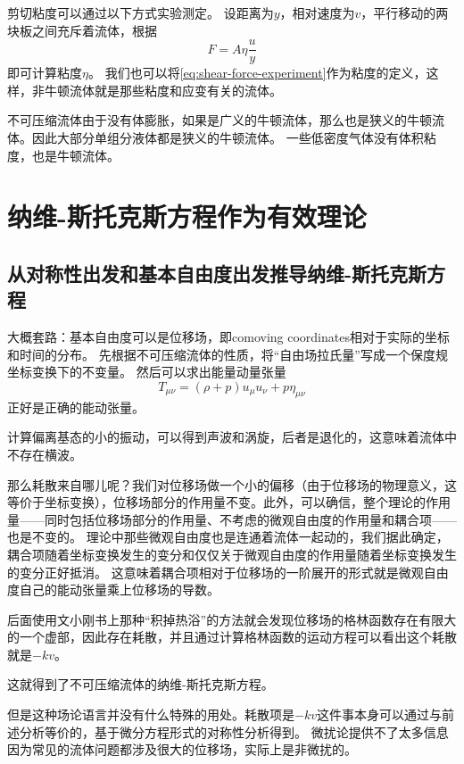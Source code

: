 剪切粘度可以通过以下方式实验测定。
设距离为$y$，相对速度为$v$，平行移动的两块板之间充斥着流体，根据
\begin{equation}
    F = A \eta \frac{u}{y}
    \label{eq:shear-force-experiment}
\end{equation}
即可计算粘度$\eta$。
我们也可以将\eqref{eq:shear-force-experiment}作为粘度的定义，这样，非牛顿流体就是那些粘度和应变有关的流体。

不可压缩流体由于没有体膨胀，如果是广义的牛顿流体，那么也是狭义的牛顿流体。因此大部分单组分液体都是狭义的牛顿流体。
一些低密度气体没有体积粘度，也是牛顿流体。

\section{纳维-斯托克斯方程作为有效理论}

\subsection{从对称性出发和基本自由度出发推导纳维-斯托克斯方程}\label{sec:ns-from-sym}

\cite{eft-fluid-rel}
大概套路：基本自由度可以是位移场，即comoving coordinates相对于实际的坐标和时间的分布。
先根据不可压缩流体的性质，将“自由场拉氏量”写成一个保度规坐标变换下的不变量。
然后可以求出能量动量张量
\begin{equation}
    T_{\mu \nu} = (\rho + p) u_\mu u_\nu + p \eta_{\mu \nu}
\end{equation}
正好是正确的能动张量。

计算偏离基态的小的振动，可以得到声波和涡旋，后者是退化的，这意味着流体中不存在横波。

那么耗散来自哪儿呢？我们对位移场做一个小的偏移（由于位移场的物理意义，这等价于坐标变换），位移场部分的作用量不变。此外，可以确信，整个理论的作用量——同时包括位移场部分的作用量、不考虑的微观自由度的作用量和耦合项——也是不变的。
理论中那些微观自由度也是连通着流体一起动的，我们据此确定，耦合项随着坐标变换发生的变分和仅仅关于微观自由度的作用量随着坐标变换发生的变分正好抵消。
这意味着耦合项相对于位移场的一阶展开的形式就是微观自由度自己的能动张量乘上位移场的导数。

后面使用文小刚书上那种“积掉热浴”的方法就会发现位移场的格林函数存在有限大的一个虚部，因此存在耗散，并且通过计算格林函数的运动方程可以看出这个耗散就是$-k v$。

这就得到了不可压缩流体的纳维-斯托克斯方程。

但是这种场论语言并没有什么特殊的用处。耗散项是$-kv$这件事本身可以通过与前述分析等价的，基于微分方程形式的对称性分析得到。
微扰论提供不了太多信息因为常见的流体问题都涉及很大的位移场，实际上是非微扰的。

